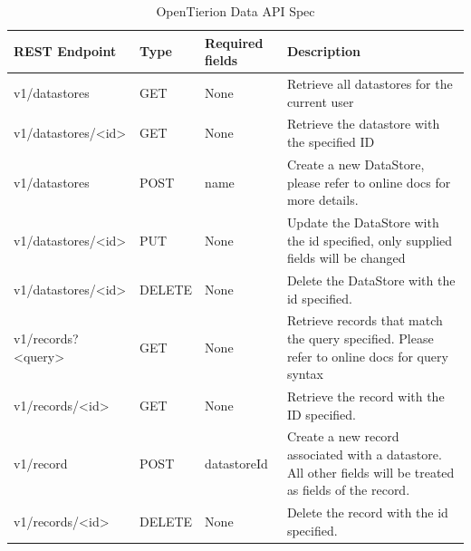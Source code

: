 \documentclass[12pt,msc,a4paper,oneside]{ucl_thesis}
\begin{document}
\begin{table}[!htbp]
    \begin{tabularx}{\textwidth}{| l l X X |}
        \hline
        \textbf{REST Endpoint} & \textbf{Type} & \textbf{Required fields} & \textbf{Description} \\
        \hline
		v1/datastores & GET & None & Retrieve all datastores for the current user \\

        v1/datastores/\textless id\textgreater & GET & None & Retrieve the datastore with the specified ID \\

        v1/datastores & POST & name & Create a new DataStore, please refer to online docs for more details. \\

        v1/datastores/\textless id\textgreater & PUT & None & Update the DataStore with the id specified, only supplied fields will be changed \\

        v1/datastores/\textless id\textgreater & DELETE & None & Delete the DataStore with the id specified. \\

        v1/records?\textless query\textgreater & GET & None & Retrieve records that match the query specified. Please refer to online docs for query syntax \\

        v1/records/\textless id\textgreater & GET & None & Retrieve the record with the ID specified. \\

        v1/record & POST & datastoreId & Create a new record associated with a datastore. All other fields will be treated as fields of the record. \\

        v1/records/\textless id\textgreater & DELETE & None & Delete the record with the id specified. \\

        \hline
    \end{tabularx}
    \caption{OpenTierion Data API Spec}
    \label{tab:opentierion_data_api}
\end{table}
\end{document}
